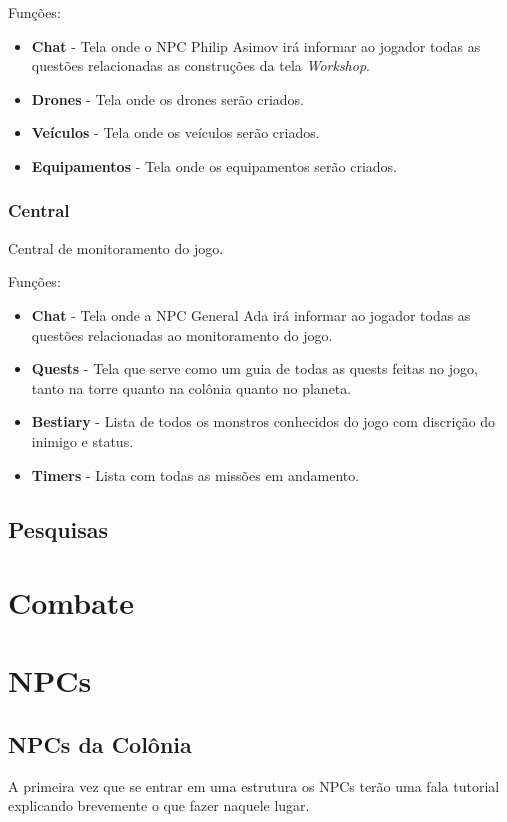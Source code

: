 \documentclass[11pt]{article} %
\begin{document}
Funções:
\begin{itemize}
  \item \textbf{Chat} - Tela onde o NPC Philip Asimov irá informar ao jogador todas as questões relacionadas as construções da tela \textit{Workshop}.
  \item \textbf{Drones} - Tela onde os drones serão criados.
  \item \textbf{Veículos} - Tela onde os veículos serão criados.
  \item \textbf{Equipamentos} - Tela onde os equipamentos serão criados. 
\end{itemize}

\subsubsection{Central}
Central de monitoramento do jogo.

Funções:
\begin{itemize}
  \item \textbf{Chat} - Tela onde a NPC General Ada irá informar ao jogador todas as questões relacionadas ao monitoramento do jogo.
  \item \textbf{Quests} - Tela que serve como um guia de todas as quests feitas no jogo, tanto na torre quanto na colônia quanto no planeta.
  \item \textbf{Bestiary} - Lista de todos os monstros conhecidos do jogo com discrição do inimigo e status.
  \item \textbf{Timers} - Lista com todas as missões em andamento.
\end{itemize}

\subsection{Pesquisas}

\section{Combate}

\newpage

\section{NPCs}

\subsection{NPCs da Colônia}
A primeira vez que se entrar em uma estrutura os NPCs terão uma fala tutorial explicando brevemente o que fazer naquele lugar.
\end{document}
